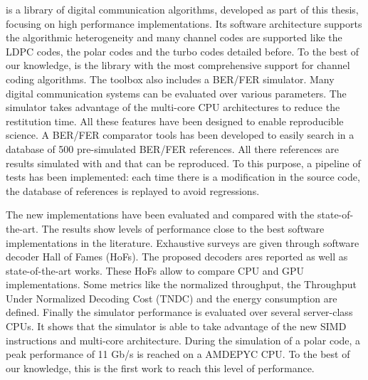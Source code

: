 \AFFECT is a library of digital communication algorithms, developed as part of
this thesis, focusing on high performance implementations. Its software
architecture supports the algorithmic heterogeneity and many channel codes are
supported like the LDPC codes, the polar codes and the turbo codes detailed
before. To the best of our knowledge, \AFFECT is the library with the most
comprehensive support for channel coding algorithms. The toolbox also includes a
BER/FER simulator. Many digital communication systems can be evaluated over
various parameters. The simulator takes advantage of the multi-core CPU
architectures to reduce the restitution time. All these features have been
designed to enable reproducible science. A BER/FER comparator tools has been
developed to easily search in a database of 500 pre-simulated BER/FER
references. All there references are results simulated with \AFFECT and that can
be reproduced. To this purpose, a pipeline of tests has been implemented: each
time there is a modification in the source code, the database of references is
replayed to avoid regressions.

The new implementations have been evaluated and compared with the
state-of-the-art. The results show levels of performance close to the best
software implementations in the literature. Exhaustive surveys are given through
software decoder Hall of Fames (HoFs). The proposed decoders ares reported as
well as state-of-the-art works. These HoFs allow to compare CPU and GPU
implementations. Some metrics like the normalized throughput, the Throughput
Under Normalized Decoding Cost (TNDC) and the energy consumption are defined.
Finally the \AFFECT simulator performance is evaluated over several server-class
CPUs. It shows that the simulator is able to take advantage of the new SIMD
instructions and multi-core architecture. During the simulation of a polar code,
a peak performance of 11 Gb/s is reached on a AMD\R  EPYC CPU. To the best of
our knowledge, this is the first work to reach this level of performance.

